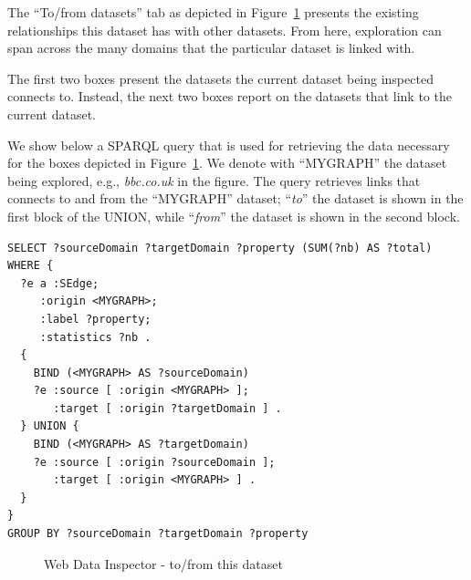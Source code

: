 The ``To/from datasets'' tab as depicted in Figure~\ref{fig:wdi:toFromThisDataset} presents the existing relationships this dataset has with other datasets. From here, exploration can span across the many domains that the particular dataset is linked with.

The first two boxes present the datasets the current dataset being inspected connects to. Instead, the next two boxes report on the datasets that link to the current dataset.

We show below a SPARQL query that is used for retrieving the data necessary for the boxes depicted in Figure~\ref{fig:wdi:toFromThisDataset}. We denote with ``MYGRAPH'' the dataset being explored, e.g., \emph{bbc.co.uk} in the figure. The query retrieves links that connects to and from the ``MYGRAPH'' dataset; ``\emph{to}'' the dataset is shown in the first block of the UNION, while ``\emph{from}'' the dataset is shown in the second block.

\begin{verbatim}
SELECT ?sourceDomain ?targetDomain ?property (SUM(?nb) AS ?total) WHERE {
  ?e a :SEdge;
     :origin <MYGRAPH>;
     :label ?property;
     :statistics ?nb .
  {
    BIND (<MYGRAPH> AS ?sourceDomain)
    ?e :source [ :origin <MYGRAPH> ];
       :target [ :origin ?targetDomain ] .
  } UNION {
    BIND (<MYGRAPH> AS ?targetDomain)
    ?e :source [ :origin ?sourceDomain ];
       :target [ :origin <MYGRAPH> ] .
  }
}
GROUP BY ?sourceDomain ?targetDomain ?property
\end{verbatim}

\begin{figure}
	\centering
	\caption{Web Data Inspector - to/from this dataset}
	\label{fig:wdi:toFromThisDataset}
\end{figure}

